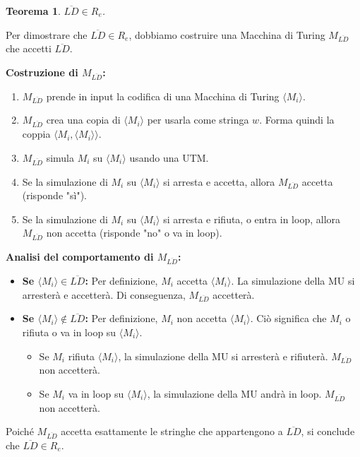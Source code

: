 \documentclass[a4paper]{article}
\makeatletter
\newtheorem{theorem}{Teorema}[section] %
\renewenvironment{proof}[1][\proofname]{\par
  \pushQED{\qed}%
  \normalfont \topsep6\p@\@plus6\p@\relax
  \trivlist
  \item[\hskip\labelsep
        \bfseries
    #1\@addpunct{.}]\ignorespaces
}{%
  \popQED\endtrivlist\@endpefalse
}
\makeatother
\begin{document}
\begin{theorem}
$\overline{LD} \in R_e$.
\end{theorem}
\begin{proof}
Per dimostrare che $\overline{LD} \in R_e$, dobbiamo costruire una Macchina di Turing $M_{\overline{LD}}$ che accetti $\overline{LD}$.

\textbf{Costruzione di $M_{\overline{LD}}$:}
\begin{enumerate}
    \item $M_{\overline{LD}}$ prende in input la codifica di una Macchina di Turing $\langle M_i \rangle$.
    \item $M_{\overline{LD}}$ crea una copia di $\langle M_i \rangle$ per usarla come stringa $w$. Forma quindi la coppia $\langle M_i, \langle M_i \rangle \rangle$.
    \item $M_{\overline{LD}}$ simula $M_i$ su $\langle M_i \rangle$ usando una UTM.
    \item Se la simulazione di $M_i$ su $\langle M_i \rangle$ si arresta e accetta, allora $M_{\overline{LD}}$ accetta (risponde "sì").
    \item Se la simulazione di $M_i$ su $\langle M_i \rangle$ si arresta e rifiuta, o entra in loop, allora $M_{\overline{LD}}$ non accetta (risponde "no" o va in loop).
\end{enumerate}
\textbf{Analisi del comportamento di $M_{\overline{LD}}$:}
\begin{itemize}
    \item \textbf{Se $\langle M_i \rangle \in \overline{LD}$:}
    Per definizione, $M_i$ accetta $\langle M_i \rangle$. La simulazione della MU si arresterà e accetterà. Di conseguenza, $M_{\overline{LD}}$ accetterà.
    \item \textbf{Se $\langle M_i \rangle \notin \overline{LD}$:}
    Per definizione, $M_i$ non accetta $\langle M_i \rangle$. Ciò significa che $M_i$ o rifiuta o va in loop su $\langle M_i \rangle$.
    \begin{itemize}
        \item Se $M_i$ rifiuta $\langle M_i \rangle$, la simulazione della MU si arresterà e rifiuterà. $M_{\overline{LD}}$ non accetterà.
        \item Se $M_i$ va in loop su $\langle M_i \rangle$, la simulazione della MU andrà in loop. $M_{\overline{LD}}$ non accetterà.
    \end{itemize}
\end{itemize}
Poiché $M_{\overline{LD}}$ accetta esattamente le stringhe che appartengono a $\overline{LD}$, si conclude che $\overline{LD} \in R_e$.
\end{proof}
\end{document}
